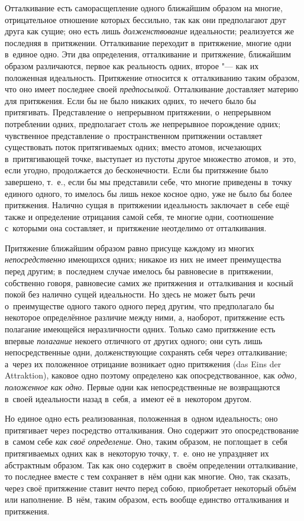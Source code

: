 
Отталкивание есть саморасщепление одного ближайшим образом на многие,
отрицательное отношение которых бессильно, так как они предполагают друг
друга как сущие; оно есть лишь {\em долженствование}
идеальности; реализуется же последняя в~притяжении. Отталкивание переходит
в~притяжение, многие одни в~единое одно. Эти два определения, отталкивание
и~притяжение, ближайшим образом различаются, первое как реальность одних,
второе "--- как их положенная идеальность. Притяжение относится к~отталкиванию
таким образом, что оно имеет последнее своей
{\em предпосылкой}. Отталкивание доставляет материю для
притяжения. Если бы не было никаких одних, то нечего было бы притягивать.
Представление о~непрерывном притяжении, о~непрерывном потреблении одних,
предполагает столь же непрерывное порождение одних; чувственное
представление о~пространственном притяжении оставляет существовать поток
притягиваемых одних; вместо атомов, исчезающих в~притягивающей точке,
выступает из пустоты другое множество атомов, и~это, если угодно,
продолжается до бесконечности. Если бы притяжение было завершено, т.~е.,
если бы мы представили себе, что многие приведены в~точку единого одного,
то имелось бы лишь некое косное одно, уже не было бы более притяжения.
Налично сущая в~притяжении идеальность заключает в~себе ещё также и
определение отрицания самой себя, те многие одни, соотношение с~которыми
она составляет, и~притяжение неотделимо от отталкивания.

Притяжение ближайшим образом равно присуще каждому из многих
{\em непосредственно} имеющихся одних; никакое из них
не имеет преимущества перед другим; в~последнем случае имелось бы
равновесие в~притяжении, собственно говоря, равновесие самих же притяжения
и~отталкивания и~косный покой без налично сущей идеальности. Но здесь не
может быть речи о~преимуществе одного такого одного перед другим, что
предполагало бы некоторое определённое различие между ними, а, наоборот,
притяжение есть полагание имеющейся неразличности одних. Только само
притяжение есть впервые {\em полагание} некоего
отличного от других одного; они суть лишь непосредственные одни,
долженствующие сохранять себя через отталкивание; а~через их положенное
отрицание возникает одно притяжения (das Eins der Attraktion), каковое одно
поэтому определено как опосредствованное, как
{\em одно, положенное как одно}. Первые одни как
непосредственные не возвращаются в~своей идеальности назад в~себя, а~имеют
её в~некотором другом.

Но единое одно есть реализованная, положенная в~одном идеальность; оно
притягивает через посредство отталкивания. Оно содержит это
опосредствование в~самом себе {\em как своё
определение}. Оно, таким образом, не поглощает в~себя притягиваемых одних
как в~некоторую точку, т.~е. оно не упраздняет их абстрактным образом. Так
как оно содержит в~своём определении отталкивание, то последнее вместе с
тем сохраняет в~нём одни как многие. Оно, так сказать, через своё
притяжение ставит нечто перед собою, приобретает некоторый объём или
наполнение. В~нём, таким образом, есть вообще единство отталкивания и
притяжения.

